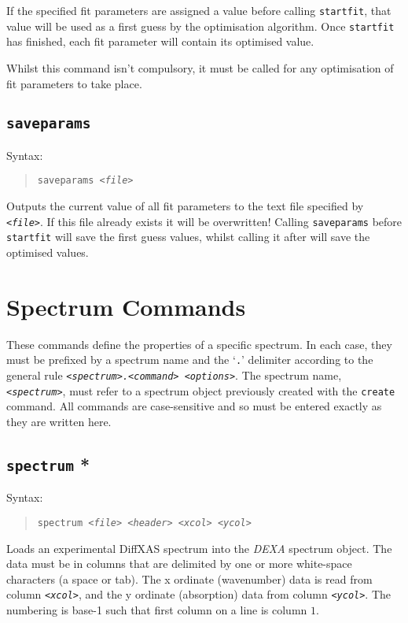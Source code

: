 \documentclass[a4paper,12pt]{report}
\newcommand{\dexa}{\emph{DEXA} }
\begin{document}
If the specified fit parameters are assigned a value before calling \verb|startfit|, that value will be used as a first guess by the optimisation algorithm. Once \verb|startfit| has finished, each fit parameter will contain its optimised value.

Whilst this command isn't compulsory, it must be called for any optimisation of fit parameters to take place. 

\subsection{\texttt{saveparams}}
Syntax:
\begin{quote}
  \texttt{saveparams \emph{<file>}}
\end{quote}
Outputs the current value of all fit parameters to the text file specified by \emph{\texttt{<file>}}. If this file already exists it will be overwritten! Calling \verb|saveparams| before \verb|startfit| will save the first guess values, whilst calling it after will save the optimised values.

\section{Spectrum Commands}
\label{sec:speccmd}
These commands define the properties of a specific spectrum. In each case, they must be prefixed by a spectrum name and the `\verb|.|' delimiter according to the general rule \texttt{\emph{<spectrum>.<command> <options>}}. The spectrum name, \texttt{\emph{<spectrum>}}, must refer to a spectrum object previously created with the \verb|create| command. All commands are case-sensitive and so must be entered exactly as they are written here.

\subsection{\texttt{spectrum} *}
Syntax:
\begin{quote}
  \texttt{spectrum \emph{<file> <header> <xcol> <ycol>}}
\end{quote}
Loads an experimental DiffXAS spectrum into the \dexa  spectrum object. The data must be in columns that are delimited by one or more white-space characters (a space or tab). The x ordinate (wavenumber) data is read from column \texttt{\emph{<xcol>}}, and the y ordinate (absorption) data from column \texttt{\emph{<ycol>}}. The numbering is base-1 such that first column on a line is column $1$. 
\end{document}
